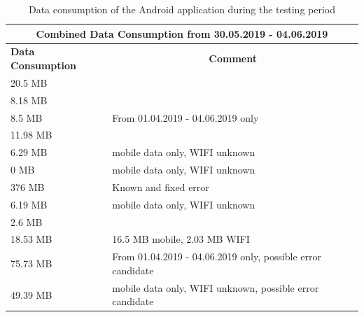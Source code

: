 \begin{table}[h!]
	\centering
	\begin{tabular}{|l|l|}
		\hline
		\multicolumn{2}{|c|}{\textbf{Combined Data Consumption from 30.05.2019 - 04.06.2019}}                     \\ \hline
		\textbf{Data Consumption} & \multicolumn{1}{c|}{\textbf{Comment}}                       \\ \hline
		20.5 MB                            &                                                             \\ \hline
		8.18 MB                            &                                                             \\ \hline
		8.5 MB                             & From 01.04.2019 - 04.06.2019 only                           \\ \hline
		11.98 MB                           &                                                             \\ \hline
		6.29 MB                            & mobile data only, WIFI unknown                              \\ \hline
		0 MB                               & mobile data only, WIFI unknown                              \\ \hline
		376 MB                             & Known and fixed error                                       \\ \hline
		6.19 MB                            & mobile data only, WIFI unknown                              \\ \hline
		2.6 MB                             &                                                             \\ \hline
		18.53 MB                           & 16.5 MB mobile, 2.03 MB WIFI                                \\ \hline
		75.73 MB                           & From 01.04.2019 - 04.06.2019 only, possible error candidate \\ \hline
		49.39 MB                           & mobile data only, WIFI unknown, possible error candidate    \\ \hline
	\end{tabular}
	\caption{Data consumption of the Android application during the testing period}
	\label{data-consumption}
\end{table}


